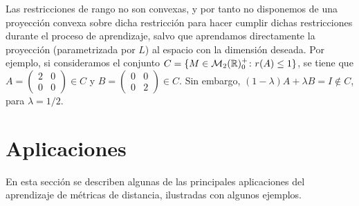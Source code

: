     \begin{example}
        Las restricciones de rango no son convexas, y por tanto no disponemos de una proyección convexa sobre dicha restricción para hacer cumplir dichas restricciones durante el proceso de aprendizaje, salvo que aprendamos directamente la proyección (parametrizada por $L$)  al espacio con la dimensión deseada. Por ejemplo, si consideramos el conjunto $C = \{ M \in \mathcal{M}_2(\mathbb{R})^+_0 \colon r(A) \le 1 \}$, se tiene que $A = \begin{pmatrix} 2 & 0 \\ 0 & 0 \end{pmatrix} \in C$ y $B = \begin{pmatrix} 0 & 0 \\ 0 & 2 \end{pmatrix} \in C$. Sin embargo, $(1-\lambda)A+\lambda B = I \notin C$, para $\lambda=1/2$. 
    \end{example}

\section{Aplicaciones} \label{section:aplicaciones}

En esta sección se describen algunas de las principales aplicaciones del aprendizaje de métricas de distancia, ilustradas con algunos ejemplos.



